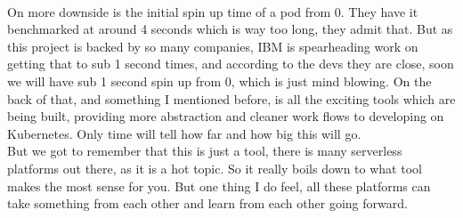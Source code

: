 \\On more downside is the initial spin up time of a pod from 0. They have it benchmarked at around 4 seconds which is way too long, they admit that. But as this project is backed by so many companies, IBM is spearheading work on getting that to sub 1 second times, and according to the devs they are close, soon we will have sub 1 second spin up from 0, which is just mind blowing. On the back of that, and something I mentioned before, is all the exciting tools which are being built, providing more abstraction and cleaner work flows to developing on Kubernetes. Only time will tell how far and how big this will go.
\\But we got to remember that this is just a tool, there is many serverless platforms out there, as it is a hot topic. So it really boils down to what tool makes the most sense for you. But one thing I do feel, all these platforms can take something from each other and learn from each other going forward. 
